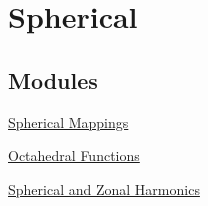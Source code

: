 \hypertarget{group__spherical__functions}{
\section{\-Spherical}
\label{group__spherical__functions}
}
\subsection*{\-Modules}
\begin{DoxyCompactItemize}
\item 
\hyperlink{group__spherical__mappings}{\-Spherical Mappings}
\item 
\hyperlink{group__octahedral__functions}{\-Octahedral Functions}
\item 
\hyperlink{group__spherical}{\-Spherical and Zonal Harmonics}
\end{DoxyCompactItemize}
